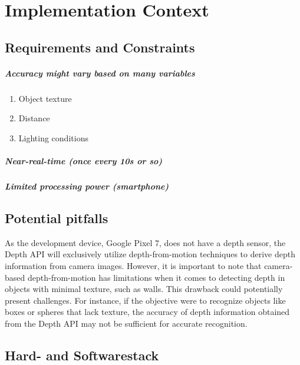 \chapter{Implementation Context}


\section{Requirements and Constraints}

\paragraph{Accuracy might vary based on many variables}

\begin{enumerate}
    \item Object texture
    \item Distance
    \item Lighting conditions
\end{enumerate}

\paragraph{Near-real-time (once every 10s or so)}

\paragraph{Limited processing power (smartphone)}


\section{Potential pitfalls}
As the development device, Google Pixel 7, does not have a depth sensor,
the Depth API will exclusively utilize depth-from-motion techniques to derive depth information from camera images.
However, it is important to note that camera-based depth-from-motion has limitations
when it comes to detecting depth in objects with minimal texture, such as walls.
This drawback could potentially present challenges.
For instance, if the objective were to recognize objects like boxes or spheres that lack texture,
the accuracy of depth information obtained from the Depth API may not be sufficient for accurate recognition. \parencite{google_llc_arcore_doc}


\section{Hard- and Softwarestack}

